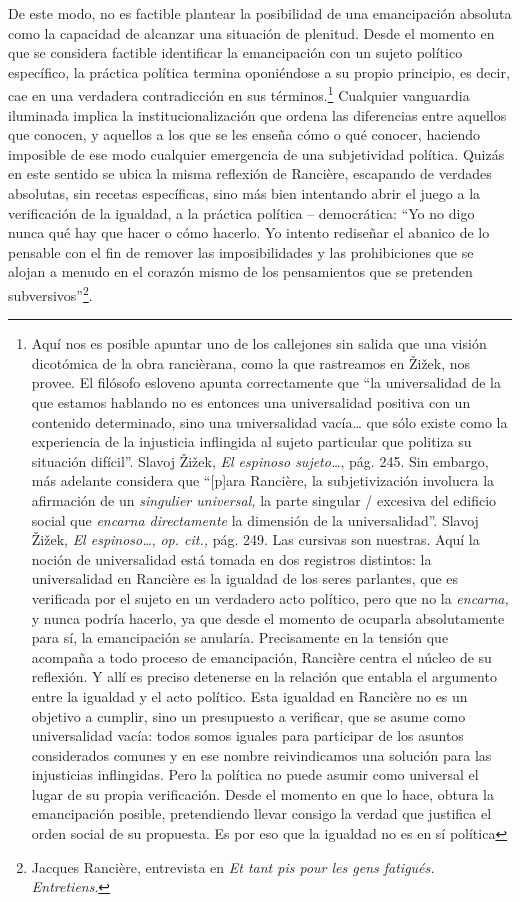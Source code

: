 De este modo, no es factible plantear la posibilidad de una emancipación absoluta como la capacidad de alcanzar una situación de plenitud. Desde el momento en que se considera factible identificar la emancipación con un sujeto político específico, la práctica política termina oponiéndose a su propio principio, es decir, cae en una verdadera contradicción en sus términos.\footnote{Aquí nos es posible apuntar uno de los callejones sin salida que una visión dicotómica de la obra rancièrana, como la que rastreamos en Žižek, nos provee. El filósofo esloveno apunta correctamente que \enquote{la universalidad de la que estamos hablando no es entonces una universalidad positiva con un contenido determinado, sino una universalidad vacía\ldots{} que sólo existe como la experiencia de la injusticia inflingida al sujeto particular que politiza su situación difícil}. Slavoj Žižek, \emph{El espinoso sujeto\ldots{}}, pág. 245. Sin embargo, más adelante considera que \enquote{{[}p{]}ara Rancière, la subjetivización involucra la afirmación de un \emph{singulier universal,} la parte singular / excesiva del edificio social que \emph{encarna directamente} la dimensión de la universalidad}. Slavoj Žižek, \emph{El espinoso\ldots{}}, \emph{op. cit.,} pág. 249. Las cursivas son nuestras. Aquí la noción de universalidad está tomada en dos registros distintos: la universalidad en Rancière es la igualdad de los seres parlantes, que es verificada por el sujeto en un verdadero acto político, pero que no la \emph{encarna,} y nunca podría hacerlo, ya que desde el momento de ocuparla absolutamente para sí, la emancipación se anularía. Precisamente en la tensión que acompaña a todo proceso de emancipación, Rancière centra el núcleo de su reflexión. Y allí es preciso detenerse en la relación que entabla el argumento entre la igualdad y el acto político. Esta igualdad en Rancière no es un objetivo a cumplir, sino un presupuesto a verificar, que se asume como universalidad vacía: todos somos iguales para participar de los asuntos considerados comunes y en ese nombre reivindicamos una solución para las injusticias inflingidas. Pero la política no puede asumir como universal el lugar de su propia verificación. Desde el momento en que lo hace, obtura la emancipación posible, pretendiendo llevar consigo la verdad que justifica el orden social de su propuesta. Es por eso que la igualdad no es en sí política} Cualquier vanguardia iluminada implica la institucionalización que ordena las diferencias entre aquellos que conocen, y aquellos a los que se les enseña cómo o qué conocer, haciendo imposible de ese modo cualquier emergencia de una subjetividad política. Quizás en este sentido se ubica la misma reflexión de Rancière, escapando de verdades absolutas, sin recetas específicas, sino más bien intentando abrir el juego a la verificación de la igualdad, a la práctica política -- democrática: \enquote{Yo no digo nunca qué hay que hacer o cómo hacerlo. Yo intento rediseñar el abanico de lo pensable con el fin de remover las imposibilidades y las prohibiciones que se alojan a menudo en el corazón mismo de los pensamientos que se pretenden subversivos}\footnote{Jacques Rancière, entrevista en \emph{Et tant pis pour les gens fatigués. Entretiens}.}.

